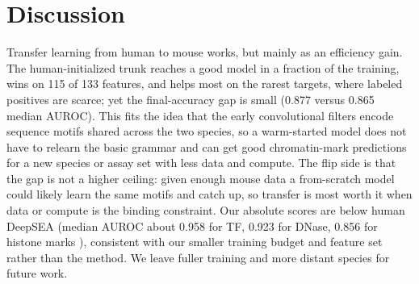 \documentclass{article}
\begin{document}
\clearpage
\section{Discussion}

Transfer learning from human to mouse works, but mainly as an efficiency gain. The
human-initialized trunk reaches a good model in a fraction of the training, wins
on 115 of 133 features, and helps most on the rarest targets, where labeled
positives are scarce; yet the final-accuracy gap is small (0.877 versus 0.865
median AUROC). This fits the idea that the early convolutional filters encode
sequence motifs shared across the two species, so a warm-started model does not
have to relearn the basic grammar and can get good chromatin-mark predictions for
a new species or assay set with less data and compute. The flip side is that the
gap is not a higher ceiling: given enough mouse data a from-scratch model could
likely learn the same motifs and catch up, so transfer is most worth it when data
or compute is the binding constraint. Our absolute scores are below human DeepSEA
(median AUROC about 0.958 for TF, 0.923 for DNase, 0.856 for histone marks
\citep{zhou2015deepsea}), consistent with our smaller training budget and feature
set rather than the method. We leave fuller training and more distant species for
future work.



\end{document}

